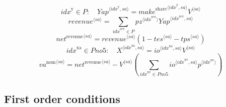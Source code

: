 \begin{equation}
{i\!d\!x}^{\mathrm{y}}\in P\colon\quad {{Y\!a\!p}}^{\langle {i\!d\!x}^{\mathrm{y}},{s\!a}\rangle} = {{{m\!a\!k\!e}^{\mathrm{share}}}^{\langle {i\!d\!x}^{\mathrm{y}},{s\!a}\rangle}} {{V}^{\langle {s\!a}\rangle}}
\end{equation}
\begin{equation}
{{r\!e\!v\!e\!n\!u\!e}}^{\langle {s\!a}\rangle} = \sum_{{i\!d\!x}^{\mathrm{rev}}\in P} {{{p\!z}}^{\langle {i\!d\!x}^{\mathrm{rev}}\rangle}} {{{Y\!a\!p}}^{\langle {i\!d\!x}^{\mathrm{rev}},{s\!a}\rangle}}
\end{equation}
\begin{equation}
{{n\!e\!t}^{\mathrm{revenue}}}^{\langle {s\!a}\rangle} = {{{r\!e\!v\!e\!n\!u\!e}}^{\langle {s\!a}\rangle}} \left(1 - {{t\!e\!s}}^{\langle {s\!a}\rangle} - {{t\!p\!s}}^{\langle {s\!a}\rangle}\right)
\end{equation}
\begin{equation}
{i\!d\!x}^{\mathrm{xa}}\in {P\!n\!o\!5}\colon\quad {X}^{\langle {i\!d\!x}^{\mathrm{xa}},{s\!a}\rangle} = {{{i\!o}}^{\langle {i\!d\!x}^{\mathrm{xa}},{s\!a}\rangle}} {{V}^{\langle {s\!a}\rangle}}
\end{equation}
\begin{equation}
{{v\!a}^{\mathrm{nom}}}^{\langle {s\!a}\rangle} = {{n\!e\!t}^{\mathrm{revenue}}}^{\langle {s\!a}\rangle} - {{V}^{\langle {s\!a}\rangle}} \left(\sum_{{i\!d\!x}^{\mathrm{xv}}\in {P\!n\!o\!5}} {{{i\!o}}^{\langle {i\!d\!x}^{\mathrm{xv}},{s\!a}\rangle}} {{p}^{\langle {i\!d\!x}^{\mathrm{xv}}\rangle}}\right)
\end{equation}


\subsection{First order conditions}

